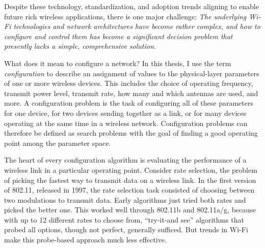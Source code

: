 
Despite these technology, standardization, and adoption trends aligning to enable future rich wireless applications, there is one major challenge:
\emph{The underlying Wi-Fi technologies and network architectures have become rather complex, and how to configure and control them has become a significant decision problem that presently lacks a simple, comprehensive solution}.

What does it mean to configure a network? In this thesis, I use the term \emph{configuration} to describe an assignment of values to the physical-layer parameters of one or more wireless devices. This includes the choice of operating frequency, transmit power level, transmit rate, how many and which antennas are used, and more. A configuration problem is the task of configuring all of these parameters for one device, for two devices sending together as a link, or for many devices operating at the same time in a wireless network. Configuration problems can therefore be defined as search problems with the goal of finding a good operating point among the parameter space.

The heart of every configuration algorithm is evaluating the performance of a wireless link in a particular operating point. Consider rate selection, the problem of picking the fastest way to transmit data on a wireless link. In the first version of 802.11, released in 1997, the rate selection task consisted of choosing between two modulations to transmit data. Early algorithms just tried both rates and picked the better one. This worked well through 802.11b and 802.11a/g, because with up to 12 different rates to choose from, ``try-it-and see'' algorithms that probed all options, though not perfect, generally sufficed. But trends in Wi-Fi make this probe-based approach much less effective.

